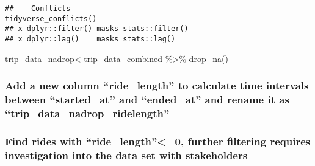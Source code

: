 \documentclass[
]{article}
\newenvironment{Shaded}{\begin{snugshade}}{\end{snugshade}}
\newcommand{\FunctionTok}[1]{\textcolor[rgb]{0.00,0.00,0.00}{#1}}
\newcommand{\NormalTok}[1]{#1}
\newcommand{\OtherTok}[1]{\textcolor[rgb]{0.56,0.35,0.01}{#1}}
\newcommand{\SpecialCharTok}[1]{\textcolor[rgb]{0.00,0.00,0.00}{#1}}
\begin{document}
\begin{verbatim}
## -- Conflicts ------------------------------------------ tidyverse_conflicts() --
## x dplyr::filter() masks stats::filter()
## x dplyr::lag()    masks stats::lag()
\end{verbatim}

\begin{Shaded}
\begin{Highlighting}[]
\NormalTok{trip\_data\_nadrop}\OtherTok{\textless{}{-}}\NormalTok{trip\_data\_combined }\SpecialCharTok{\%\textgreater{}\%} \FunctionTok{drop\_na}\NormalTok{()}
\end{Highlighting}
\end{Shaded}

\hypertarget{add-a-new-column-ride_length-to-calculate-time-intervals-between-started_at-and-ended_at-and-rename-it-as-trip_data_nadrop_ridelength}{%
\subsubsection{Add a new column ``ride\_length'' to calculate time
intervals between ``started\_at'' and ``ended\_at'' and rename it as
``trip\_data\_nadrop\_ridelength''}\label{add-a-new-column-ride_length-to-calculate-time-intervals-between-started_at-and-ended_at-and-rename-it-as-trip_data_nadrop_ridelength}}

\begin{Shaded}
\end{Shaded}

\hypertarget{find-rides-with-ride_length0-further-filtering-requires-investigation-into-the-data-set-with-stakeholders}{%
\subsubsection{Find rides with ``ride\_length''\textless=0, further
filtering requires investigation into the data set with
stakeholders}\label{find-rides-with-ride_length0-further-filtering-requires-investigation-into-the-data-set-with-stakeholders}}
\end{document}
